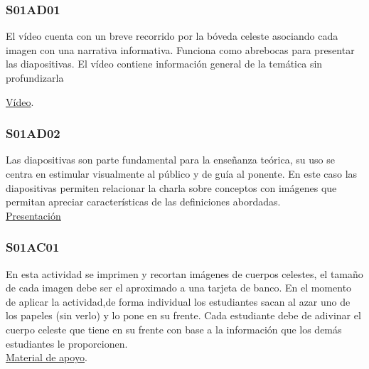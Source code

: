 \documentclass[10pt,a4paper]{article}
\begin{document}
\subsubsection{S01AD01}
El vídeo cuenta con un breve recorrido por la bóveda celeste asociando cada imagen con una narrativa informativa.  Funciona como abrebocas para presentar las diapositivas. El vídeo contiene información general de la temática sin profundizarla

\href{https://www.youtube.com/watch?v=uDNVux4hifg}{\underline{Vídeo}}.

\subsubsection{S01AD02}
Las diapositivas son parte fundamental para la enseñanza teórica, su uso se centra en estimular visualmente al público y de guía al ponente. En este caso las diapositivas permiten relacionar la charla sobre conceptos con imágenes que permitan apreciar características de las definiciones abordadas. \\

\href{https://github.com/miguelta281/Universo_Medible_II/blob/master/Presentaciones/Sesiones/Sesion_1/sesion_1.pdf}{\underline{Presentación}} 
\subsubsection{S01AC01}
En esta actividad se imprimen y recortan imágenes de cuerpos celestes, el tamaño de cada imagen debe ser el aproximado a una tarjeta de banco. En el momento de aplicar la actividad,de forma individual los estudiantes sacan al azar uno de los papeles (sin verlo) y lo pone en su frente. Cada estudiante debe de adivinar el cuerpo celeste que tiene en su frente con base a la información que los demás estudiantes le proporcionen. \\

\href{https://drive.google.com/open?id=1RAebM96U-GMtoShplpoVWEjKgREIFwrt}{\underline{Material de apoyo}}.
\end{document}
